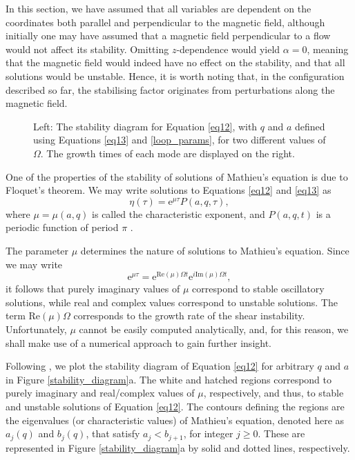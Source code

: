 \documentclass[12pt]{ociamthesis}
\begin{document}
In this section, we have assumed that all variables are dependent on the coordinates both parallel and perpendicular to the magnetic field, although initially one may have assumed that a magnetic field perpendicular to a flow would not affect its stability.
Omitting $z$-dependence would yield $\alpha = 0$, meaning that the magnetic field would indeed have no effect on the stability, and that all solutions would be unstable.
Hence, it is worth noting that, in the configuration described so far, the stabilising factor originates from perturbations along the magnetic field.

\begin{figure*}[t]
\centering
{}
\hspace{3pt}
\caption{Left: The stability diagram for Equation \eqref{eq12}, with $q$ and $a$ defined using Equations \eqref{eq13} and \eqref{loop_params}, for two different values of $\Omega$. The growth times of each mode are displayed on the right.}
\label{stability_growth}
\end{figure*}

One of the properties of the stability of solutions of Mathieu's equation is due to Floquet's theorem. We may write solutions to Equations \eqref{eq12} and \eqref{eq13} as
\begin{equation}
\label{eq14}
\eta(\tau) = \mathrm{e}^{\mu \tau} P(a, q, \tau),
\end{equation}
where $\mu = \mu(a, q)$ is called the characteristic exponent, and $P(a, q, t)$ is a periodic function of period $\pi$ \citep{McLachlan1946}.

The parameter $\mu$ determines the nature of solutions to Mathieu's equation.
Since we may write 
\[
\mathrm e^{\mu \tau} = \mathrm e^{\mathrm{Re}(\mu) \Omega t} \mathrm e^{i \mathrm{Im}(\mu) \Omega t},
\]
it follows that purely imaginary values of $\mu$ correspond to stable oscillatory solutions, while real and complex values correspond to unstable solutions.
The term $\mathrm{Re}(\mu) \Omega$ corresponds to the growth rate of the shear instability.
Unfortunately, $\mu$ cannot be easily computed analytically, and, for this reason, we shall make use of a numerical approach to gain further insight.

Following \cite{McLachlan1946}, we plot the stability diagram of Equation \eqref{eq12} for arbitrary $q$ and $a$ in Figure \ref{stability_diagram}a.
The white and hatched regions correspond to purely imaginary and real/complex values of $\mu$, respectively, and thus, to stable and unstable solutions of Equation \eqref{eq12}.
The contours defining the regions are the eigenvalues (or characteristic values) of Mathieu's equation, denoted here as $a_j(q)$ and $b_j(q)$, that satisfy $a_j < b_{j+1}$, for integer $j \geq 0$.
These are represented in Figure \ref{stability_diagram}a by solid and dotted lines, respectively.
\end{document}
